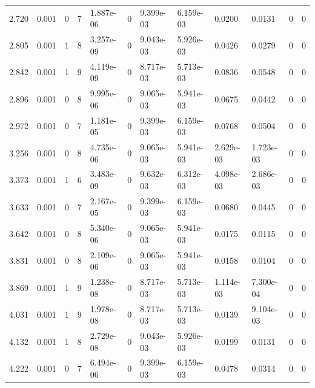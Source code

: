 \documentclass[preview]{standalone}
\begin{document}
{{\begin{tabular}{L{1.2cm}C{1.2cm} C{0.3cm}C{0.5cm} C{1.4cm}C{1.4cm} C{1.4cm}C{1.4cm} C{1.6cm}C{1.6cm} C{1.6cm}C{1.6cm}}
  2.720  &  0.001  & 0     &  7 &  1.887e-06  & 0  &  9.399e-03&   6.159e-03& 0.0200 & 0.0131   &  0 & 0  \\ 
  2.805  &  0.001  & 1     &  8 &  3.257e-09  & 0  &  9.043e-03&   5.926e-03& 0.0426 & 0.0279   &  0 & 0  \\ 
  2.842  &  0.001  & 1     &  9 &  4.119e-09  & 0  &  8.717e-03&   5.713e-03& 0.0836 & 0.0548   &  0 & 0  \\ 
  2.896  &  0.001  & 0     &  8 &  9.995e-06  & 0  &  9.065e-03&   5.941e-03& 0.0675 & 0.0442   &  0 & 0  \\ 
  2.972  &  0.001  & 0     &  7 &  1.181e-05  & 0  &  9.399e-03&   6.159e-03& 0.0768 & 0.0504   &  0 & 0  \\ 
  3.256  &  0.001  & 0     &  8 &  4.735e-06  & 0  &  9.065e-03&   5.941e-03& 2.629e-03 & 1.723e-03   &  0 & 0  \\ 
  3.373  &  0.001  & 1     &  6 &  3.483e-09  & 0  &  9.632e-03&   6.312e-03& 4.098e-03 & 2.686e-03   &  0 & 0  \\ 
  3.633  &  0.001  & 0     &  7 &  2.167e-05  & 0  &  9.399e-03&   6.159e-03& 0.0680 & 0.0445   &  0 & 0  \\ 
  3.642  &  0.001  & 0     &  8 &  5.340e-06  & 0  &  9.065e-03&   5.941e-03& 0.0175 & 0.0115   &  0 & 0  \\ 
  3.831  &  0.001  & 0     &  8 &  2.109e-06  & 0  &  9.065e-03&   5.941e-03& 0.0158 & 0.0104   &  0 & 0  \\ 
  3.869  &  0.001  & 1     &  9 &  1.238e-08  & 0  &  8.717e-03&   5.713e-03& 1.114e-03 & 7.300e-04   &  0 & 0  \\ 
  4.031  &  0.001  & 1     &  9 &  1.978e-08  & 0  &  8.717e-03&   5.713e-03& 0.0139 & 9.104e-03   &  0 & 0  \\ 
  4.132  &  0.001  & 1     &  8 &  2.729e-08  & 0  &  9.043e-03&   5.926e-03& 0.0199 & 0.0131   &  0 & 0  \\ 
  4.222  &  0.001  & 0     &  7 &  6.494e-06  & 0  &  9.399e-03&   6.159e-03& 0.0478 & 0.0314   &  0 & 0  \\ 
\hline 
\end{tabular} 

}}
\end{document}
